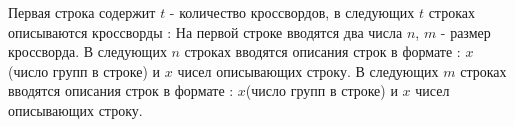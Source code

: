 Первая строка содержит $t$ - количество кроссвордов, в следующих $t$ строках описываются кроссворды :  
На первой строке вводятся два числа $n$, $m$ - размер кроссворда. 
В следующих $n$ строках вводятся описания строк в формате : $x$(число групп в строке) и $x$ чисел описывающих строку.
В следующих $m$ строках вводятся описания строк в формате : $x$(число групп в строке) и $x$ чисел описывающих строку.